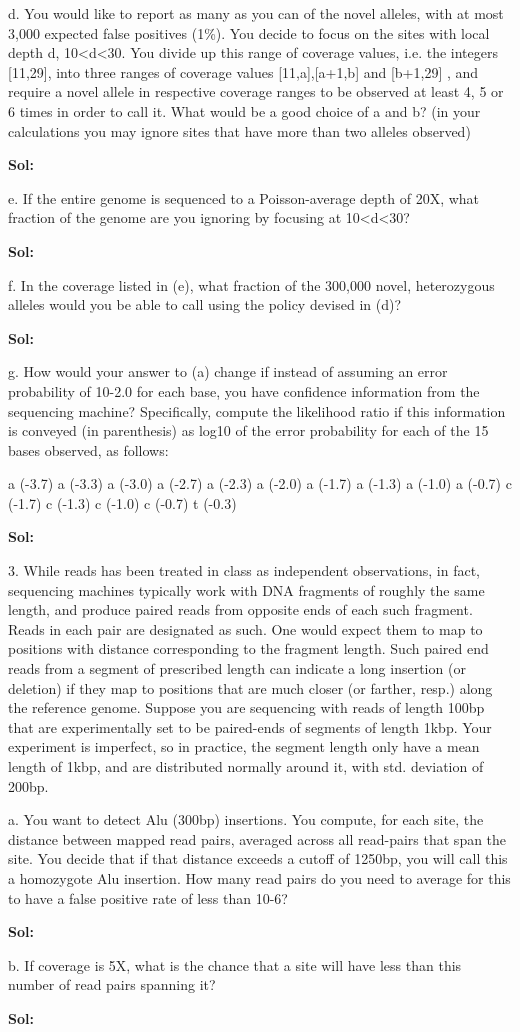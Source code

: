 \documentclass[a4paper,11pt]{article}
\begin{document}
d.  You would like to report as many as you can of the novel alleles, with at most 3,000 expected false positives (1\%). You decide to focus on the sites with local depth d, 10<d<30. You divide up this range of coverage
values, i.e. the integers [11,29], into three ranges of coverage values [11,a],[a+1,b] and [b+1,29] , and require a novel allele in respective coverage ranges to be observed at least 4, 5 or 6 times in order to call it.
What would be a good choice of a and b? (in your calculations you may ignore sites that have more than two alleles observed)

\textbf{Sol:}

e.  If the entire genome is sequenced to a Poisson-average depth of 20X, what fraction of the genome are you ignoring by focusing at 10<d<30?

\textbf{Sol:}

f.  In the coverage listed in (e), what fraction of the 300,000 novel, heterozygous alleles would you be able to call using the policy devised in (d)?

\textbf{Sol:}

g.  How would your answer to (a) change if instead of assuming an error probability of 10-2.0 for each base, you have confidence information from the sequencing machine? Specifically, compute the likelihood ratio if this
information is conveyed (in parenthesis) as log10 of the error probability for each of the 15 bases observed, as follows:

a (-3.7) a (-3.3) a (-3.0) a (-2.7) a (-2.3) a (-2.0) a (-1.7) a (-1.3) a (-1.0) a (-0.7)
c (-1.7) c (-1.3) c (-1.0) c (-0.7)
t (-0.3)


\textbf{Sol:}


3.  While reads has been treated in class as independent observations, in fact, sequencing machines typically work with DNA fragments of roughly the same length, and produce paired reads from opposite ends of each such fragment. Reads in each pair are designated as such. One would expect them to map to positions with distance corresponding to the fragment length. Such paired end reads from a segment of prescribed length can indicate a long insertion (or deletion) if they map to positions that are much closer (or farther, resp.) along the reference genome. Suppose you are sequencing with reads of length 100bp that are experimentally set to be paired-ends of segments of length 1kbp. Your experiment is imperfect, so in practice, the segment length only have a mean length of 1kbp, and are distributed normally around it, with std. deviation of 200bp.

a.  You want to detect Alu (300bp) insertions. You compute, for each site, the distance between mapped read pairs, averaged across all read-pairs that span the site. You decide that if that distance exceeds a cutoff of 1250bp, you will call this a homozygote Alu insertion. How many read pairs do you need to average for this to have a false positive rate of less than 10-6?

\textbf{Sol:}

b.  If coverage is 5X, what is the chance that a site will have less than this number of read pairs spanning it?

\textbf{Sol:}
\end{document}
